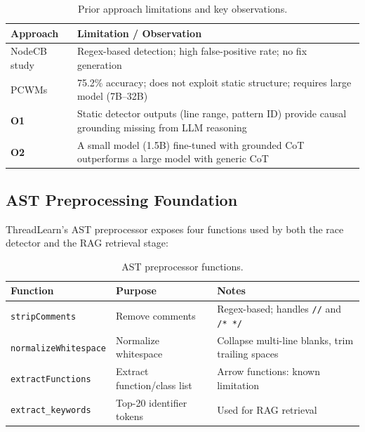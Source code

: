 \documentclass[11pt]{article}
\begin{document}
\begin{table}[ht]
  \centering
  \caption{Prior approach limitations and key observations.}
  \label{tab:limits}
  \begin{tabular}{@{}lp{9.5cm}@{}}
    \toprule
    \textbf{Approach} & \textbf{Limitation / Observation} \\
    \midrule
    NodeCB study  & Regex-based detection; high false-positive rate; no fix generation \\
    PCWMs         & 75.2\% accuracy; does not exploit static structure;
                    requires large model (7B--32B) \\
    \midrule
    \textbf{O1}   & Static detector outputs (line range, pattern ID) provide
                    causal grounding missing from LLM reasoning \\
    \textbf{O2}   & A small model (1.5B) fine-tuned with grounded CoT
                    outperforms a large model with generic CoT \\
    \bottomrule
  \end{tabular}
\end{table}

\subsection{AST Preprocessing Foundation}

ThreadLearn's AST preprocessor exposes four functions used by both the race
detector and the RAG retrieval stage:

\begin{table}[ht]
  \centering
  \caption{AST preprocessor functions.}
  \label{tab:ast}
  \begin{tabular}{@{}llp{5cm}@{}}
    \toprule
    \textbf{Function} & \textbf{Purpose} & \textbf{Notes} \\
    \midrule
    \texttt{stripComments}       & Remove comments               & Regex-based; handles \texttt{//} and \texttt{/* */} \\
    \texttt{normalizeWhitespace} & Normalize whitespace          & Collapse multi-line blanks, trim trailing spaces \\
    \texttt{extractFunctions}    & Extract function/class list   & Arrow functions: known limitation \\
    \texttt{extract\_keywords}   & Top-20 identifier tokens      & Used for RAG retrieval \\
    \bottomrule
  \end{tabular}
\end{table}
\end{document}
